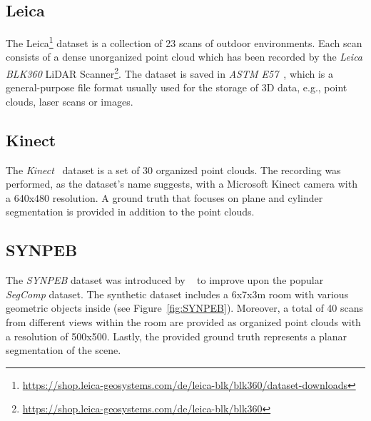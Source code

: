 \documentclass[main.tex]{subfiles}
\begin{document}
\subsection{Leica}
\label{subsec:bg-Leica}
The Leica\footnote{\href{https://shop.leica-geosystems.com/de/leica-blk/blk360/dataset-downloads}{https://shop.leica-geosystems.com/de/leica-blk/blk360/dataset-downloads}}
dataset is a collection of 23 scans of outdoor environments.
Each scan consists of a dense unorganized point cloud which has been recorded by the \textit{Leica BLK360}
LiDAR Scanner\footnote{\href{https://shop.leica-geosystems.com/de/leica-blk/blk360}{https://shop.leica-geosystems.com/de/leica-blk/blk360}}.
The dataset is saved in \textit{ASTM E57}~\cite{Huber-2011-7211}, which is a general-purpose file format usually used for the
storage of 3D data, e.g., point clouds, laser scans or images.

\subsection{Kinect}
\label{subsec:bg-Kinect}
The \textit{Kinect}~\cite{Oehler_Stueckler_Welle_Schulz_Behnke_2011} dataset is a set of 30 organized point clouds. The recording was performed, as the
dataset's name suggests, with a Microsoft Kinect camera with a 640x480 resolution.
A ground truth that focuses on plane and cylinder segmentation is provided in addition to the point clouds.

\subsection{SYNPEB}
\label{subsec:bg-SYNPEB}
The \textit{SYNPEB} dataset was introduced by \citeauthor{schaefer19icra}~\cite{schaefer19icra} to improve upon the popular
\textit{SegComp} dataset. The synthetic dataset includes a 6x7x3m room with various geometric objects inside (see Figure~\ref{fig:SYNPEB}).
Moreover, a total of 40 scans from different views within the room are provided as organized point clouds with
a resolution of 500x500. Lastly, the provided ground truth represents a planar segmentation of the scene.
\end{document}
